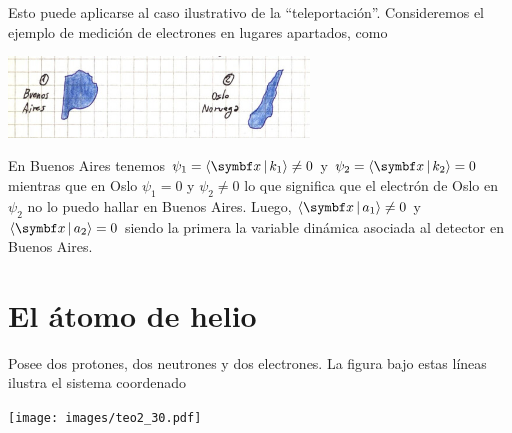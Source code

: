\documentclass[10pt,oneside]{CBFT_book}
\begin{document}
Esto puede aplicarse al caso ilustrativo de la ``teleportación''.
Consideremos el ejemplo de medición de electrones en lugares apartados, como

\includegraphics[width=0.6\textwidth]{images/fig_ft2_extra_identical.jpg}

En Buenos Aires tenemos $\psi_1 = \Braket{\vbx | k_1} \neq 0 $ y $\psi_2 = \Braket{\vbx | k_2} = 0 $
mientras que en Oslo $\psi_1 = 0 $ y $\psi_2 \neq 0 $ lo que significa que el electrón de Oslo en $\psi_2$
no lo puedo hallar en Buenos Aires.
Luego, $\Braket{\vbx|a_1}\neq 0 $ y $\Braket{\vbx|a_2} = 0 $ siendo la primera la variable dinámica asociada
al detector en Buenos Aires.


\section{El átomo de helio}

Posee dos protones, dos neutrones y dos electrones. La figura bajo estas líneas ilustra el sistema
coordenado

\texttt{[image: images/teo2\_30.pdf]}
\end{document}
